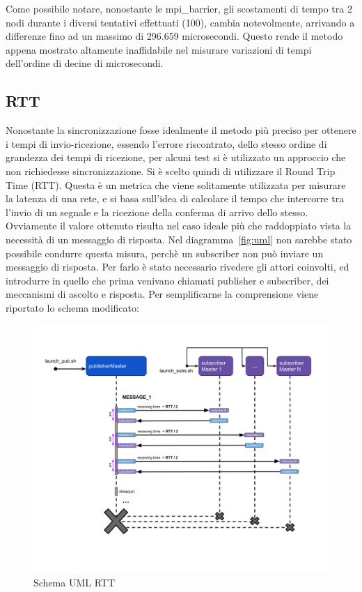 Come possibile notare, nonostante le mpi\_barrier, gli scostamenti di tempo tra 2 nodi durante i diversi tentativi effettuati (100), cambia notevolmente, arrivando a differenze fino ad un massimo di 296.659 microsecondi. 
Questo rende il metodo appena mostrato altamente inaffidabile nel 
misurare variazioni di tempi dell'ordine di decine di microsecondi. 


\subsection{RTT}\label{sec:timeRTT}

Nonostante la sincronizzazione fosse idealmente il metodo più preciso per ottenere i tempi di invio-ricezione, essendo l'errore riscontrato, dello stesso ordine di grandezza dei tempi di ricezione, per alcuni test si è utilizzato un approccio che non richiedesse sincronizzazione. Si è scelto quindi di utilizzare il Round Trip Time (RTT).
Questa è un metrica che viene solitamente utilizzata per misurare la latenza di una rete, e si basa sull'idea di calcolare il tempo che intercorre tra l'invio di un segnale e la ricezione della conferma di arrivo dello stesso. Ovviamente il valore ottenuto risulta nel caso ideale più che raddoppiato vista la necessità di un messaggio di risposta. Nel diagramma~\ref{fig:uml} non sarebbe stato possibile condurre questa misura, perchè un subscriber non può inviare un messaggio di risposta.
Per farlo è stato necessario rivedere gli attori coinvolti, ed introdurre in quello che prima venivano chiamati publisher e subscriber, dei meccanismi di ascolto e risposta.
Per semplificarne la comprensione viene riportato lo schema modificato:

\begin{figure}[H]
    \includegraphics[width=\textwidth]{./img/RTT.png}
    \caption{Schema UML RTT}\label{fig:rtt_uml}
\end{figure} 

